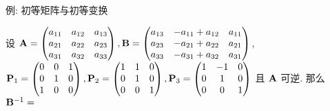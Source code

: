 \begin{frame}{例: 初等矩阵与初等变换}
	\onslide<+->
	\begin{exercise}
		设 ${\mathbf{A}}=\begin{pmatrix}
			a_{11}&a_{12}&a_{13}\\
			a_{21}&a_{22}&a_{23}\\
			a_{31}&a_{32}&a_{33}
		\end{pmatrix},{\mathbf{B}}=\begin{pmatrix}
			a_{13}&-a_{11}+a_{12}&a_{11}\\
			a_{23}&-a_{21}+a_{22}&a_{21}\\
			a_{33}&-a_{31}+a_{32}&a_{31}
		\end{pmatrix}$,\\
		${\mathbf{P}}_1=\begin{pmatrix}
			0&0&1\\0&1&0\\1&0&0
		\end{pmatrix},{\mathbf{P}}_2=\begin{pmatrix}
			1&1&0\\0&1&0\\0&0&1
		\end{pmatrix},{\mathbf{P}}_3=\begin{pmatrix}
			1&-1&0\\0&1&0\\0&0&1
		\end{pmatrix}$ 且 ${\mathbf{A}}$ 可逆.
		那么 ${\mathbf{B}}^{-1}=$
	\end{exercise}
\end{frame}


